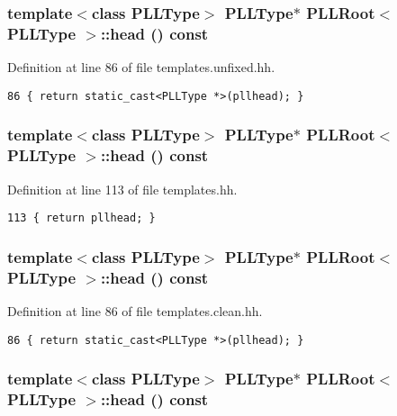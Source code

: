 \subsubsection{\setlength{\rightskip}{0pt plus 5cm}template$<$class PLLType$>$ {\bf PLLType}$\ast$ PLLRoot$<$ {\bf PLLType} $>$::head () const\hspace{0.3cm}{\tt  [inline]}}\label{classPLLRoot_a53}




Definition at line 86 of file templates.unfixed.hh.



\footnotesize\begin{verbatim}86 { return static_cast<PLLType *>(pllhead); } 
\end{verbatim}\normalsize 
{}
\subsubsection{\setlength{\rightskip}{0pt plus 5cm}template$<$class PLLType$>$ {\bf PLLType}$\ast$ PLLRoot$<$ {\bf PLLType} $>$::head () const\hspace{0.3cm}{\tt  [inline]}}\label{classPLLRoot_a36}




Definition at line 113 of file templates.hh.



\footnotesize\begin{verbatim}113 { return pllhead; } 
\end{verbatim}\normalsize 
{}
\subsubsection{\setlength{\rightskip}{0pt plus 5cm}template$<$class PLLType$>$ {\bf PLLType}$\ast$ PLLRoot$<$ {\bf PLLType} $>$::head () const\hspace{0.3cm}{\tt  [inline]}}\label{classPLLRoot_a19}




Definition at line 86 of file templates.clean.hh.



\footnotesize\begin{verbatim}86 { return static_cast<PLLType *>(pllhead); } 
\end{verbatim}\normalsize 
{}
\subsubsection{\setlength{\rightskip}{0pt plus 5cm}template$<$class PLLType$>$ {\bf PLLType}$\ast$ PLLRoot$<$ {\bf PLLType} $>$::head () const\hspace{0.3cm}{\tt  [inline]}}\label{classPLLRoot_a2}




